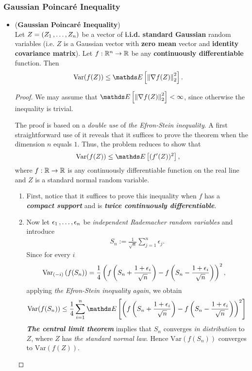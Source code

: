\documentclass[11pt]{article}
\begin{document}
\subsubsection{Gaussian Poincar{\'e} Inequality}
\begin{itemize}
\item \begin{theorem} (\textbf{Gaussian Poincar{\'e} Inequality}) \citep{boucheron2013concentration} \\
Let $Z = (Z_1 \,{,}\ldots{,}\, Z_n)$ be a vector of \textbf{i.i.d. standard Gaussian} random variables (i.e. $Z$ is a Gaussian vector with \textbf{zero mean} vector and \textbf{identity covariance matrix}). Let $f : {\mathbb R}^n \to {\mathbb R}$ be any \textbf{continuously differentiable} function. Then
\begin{align}
\text{Var}(f(Z)) &\le \E{}{\norm{\nabla f(Z)}{2}^2}. \label{ineqn: gaussian_poincare_inequality}
\end{align}
\end{theorem}
\begin{proof}
We may assume that $\E{}{\norm{\nabla f(Z)}{2}^2} <\infty$, since otherwise the inequality is trivial. 

The proof is based on a \emph{double use} of \emph{the Efron-Stein inequality}.  A first straightforward use of it reveals that it suffices to prove the theorem when the dimension $n$ equals $1$. Thus, the problem reduces to show that
\begin{align}
\text{Var}(f(Z)) &\le \E{}{(f'(Z))^2}, \label{ineqn: gaussian_poincare_inequality_step1}
\end{align} where $f: {\mathbb R} \to {\mathbb R}$ is any continuously differentiable function on the real line and $Z$ is a standard normal random variable. 
\begin{enumerate}
\item First, notice that it suffices to prove this inequality when $f$ has a \emph{\textbf{compact support}} and is \emph{\textbf{twice continuously differentiable}}. 

\item Now let $\epsilon_1 \,{,}\ldots{,}\, \epsilon_n$ be \emph{independent Rademacher random variables} and introduce
\begin{align*}
S_n := \frac{1}{\sqrt{n}}\sum_{j=1}^{n}\epsilon_j.
\end{align*}
Since for every $i$
\begin{align*}
\text{Var}_{(-i)}\left(f(S_n)\right) &= \frac{1}{4}\left(f\left(S_n + \frac{1+ \epsilon_i}{\sqrt{n}} \right)  - f\left(S_n - \frac{1+ \epsilon_i}{\sqrt{n}} \right)\right)^2,
\end{align*}
applying \emph{the Efron-Stein inequality again}, we obtain
\begin{align}
\text{Var}(f(S_n)) &\le   \frac{1}{4}\sum_{i=1}^{n}\E{}{\paren{f\paren{S_n + \frac{1+ \epsilon_i}{\sqrt{n}} }  - f\paren{S_n - \frac{1+ \epsilon_i}{\sqrt{n}} }}^2}  \label{ineqn: gaussian_poincare_inequality_step2} 
\end{align}
\emph{\textbf{The central limit theorem}} implies that $S_n$ converges \emph{in distribution} to $Z$, where $Z$ has \emph{the standard normal law}. Hence $\text{Var}(f(S_n))$ converges to $\text{Var}(f(Z))$.


\end{enumerate}
\end{proof}
\end{itemize}
\end{document}
